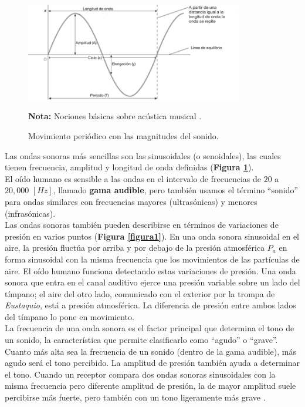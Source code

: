 \documentclass[letter,11pt]{article}
\newcommand{\source}[1]{\vspace{-11pt} \caption*{\small{\textbf{Nota:} {#1}}}}
\begin{document}
\begin{figure}
\centering
\includegraphics[width=0.85\textwidth]{resources/f2.eps}
\caption{Movimiento periódico con las magnitudes del sonido.}
\label{figura2}
\source{Nociones básicas sobre acústica musical \cite{MIGUELMORATEORGANOLOGIA}.}
\end{figure}

Las ondas sonoras más sencillas son las sinusoidales (o senoidales), las cuales
tienen frecuencia, amplitud y longitud de onda definidas
(\textbf{Figura \ref{figura2}}).
\\

El oído humano es sensible a las ondas en el intervalo de frecuencias de $20$ a
$20,000$ $[Hz]$, llamado \textbf{gama audible}, pero también usamos el término
``sonido'' para ondas similares con frecuencias mayores (ultrasónicas) y menores
(infrasónicas).
\\

Las ondas sonoras también pueden describirse en términos de variaciones de
presión en varios puntos (\textbf{Figura \ref{figura1}}). En una onda sonora
sinusoidal en el aire, la presión fluctúa por arriba y por debajo de la presión
atmosférica $P_a$ en forma sinusoidal con la misma frecuencia que los
movimientos de las partículas de aire. El oído humano funciona detectando estas
variaciones de presión. Una onda sonora que entra en el canal auditivo ejerce
una presión variable sobre un lado del tímpano; el aire del otro lado,
comunicado con el exterior por la trompa de \emph{Eustaquio}, está a presión
atmosférica. La diferencia de presión entre ambos lados del tímpano lo pone en
movimiento.
\\

La frecuencia de una onda sonora es el factor principal que determina el tono de
un sonido, la característica que permite clasificarlo como ``agudo'' o
``grave''. Cuanto más alta sea la frecuencia de un sonido (dentro de la gama
audible), más agudo será el tono percibido. La amplitud de presión también ayuda
a determinar el tono. Cuando un receptor compara dos ondas sonoras sinusoidales
con la misma frecuencia pero diferente amplitud de presión, la de mayor amplitud
suele percibirse más fuerte, pero también con un tono ligeramente más grave
\cite{Young&Freedman}.
\end{document}
